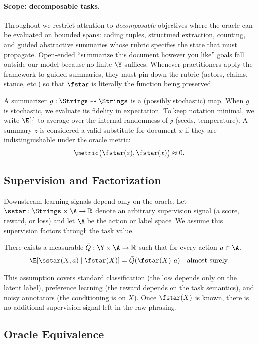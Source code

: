 \paragraph{Scope: decomposable tasks.}
Throughout we restrict attention to \emph{decomposable} objectives where the oracle can be evaluated on bounded spans: coding tuples, structured extraction, counting, and guided abstractive summaries whose rubric specifies the state that must propagate. Open-ended ``summarize this document however you like'' goals fall outside our model because no finite $\Y$ suffices. Whenever practitioners apply the framework to guided summaries, they must pin down the rubric (actors, claims, stance, etc.) so that $\fstar$ is literally the function being preserved.

A summarizer $g: \Strings \rightsquigarrow \Strings$ is a (possibly stochastic) map. When $g$ is stochastic, we evaluate its fidelity in expectation. To keep notation minimal, we write $\E[\cdot]$ to average over the internal randomness of $g$ (seeds, temperature). A summary $z$ is considered a valid substitute for document $x$ if they are indistinguishable under the oracle metric:
\[
\metric\big(\fstar(z), \fstar(x)\big) \approx 0.
\]

\subsection{Supervision and Factorization}

Downstream learning signals depend only on the oracle. Let $\sstar: \Strings \times \A \to \mathbb{R}$ denote an arbitrary supervision signal (a score, reward, or loss) and let $\A$ be the action or label space. We assume this supervision factors through the task value.

\begin{assumption}\label{ass:CF}
There exists a measurable $\bar{Q}: \Y \times \A \to \mathbb{R}$ such that for every action $a \in \A$,
\[
\E\!\left[\sstar(X, a) \mid \fstar(X)\right] = \bar{Q}(\fstar(X), a) \quad \text{almost surely.}
\]
\end{assumption}

This assumption covers standard classification (the loss depends only on the latent label), preference learning (the reward depends on the task semantics), and noisy annotators (the conditioning is on $X$). Once $\fstar(X)$ is known, there is no additional supervision signal left in the raw phrasing.

\subsection{Oracle Equivalence}


